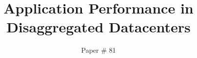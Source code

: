 \documentclass[10pt,twocolumn]{article}
\begin{document}
\title{\bf Application Performance in Disaggregated Datacenters}
\author{Paper \# 81}
\date{}
\maketitle
\thispagestyle{empty}





%

%

%






\end{document}
